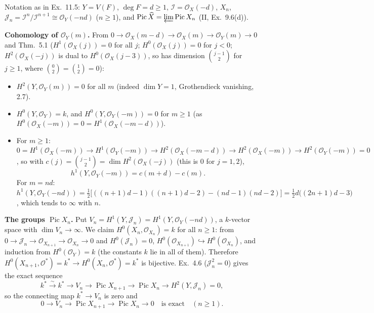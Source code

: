 \documentclass[11pt]{article}
\begin{document}
\pf
Notation as in Ex.~11.5: $Y=V(F)$, $\deg F=d\ge1$, $\mathcal I=\mathcal O_X(-d)$, $X_n$, $\mathcal J_n=\mathcal I^n/\mathcal I^{n+1}\cong\mathcal O_Y(-nd)$ ($n\geq 1$), and $\operatorname{Pic}\widehat X=\varprojlim\operatorname{Pic}X_n$ (II, Ex.~9.6(d)).

\medskip
\textbf{Cohomology of $\mathcal O_Y(m)$.} From $0\to\mathcal O_X(m-d)\to\mathcal O_X(m)\to\mathcal O_Y(m)\to0$ and Thm.~5.1 ($H^1(\mathcal O_X(j))=0$ for all $j$; $H^0(\mathcal O_X(j))=0$ for $j<0$; $H^2(\mathcal O_X(-j))$ is dual to $H^0(\mathcal O_X(j-3))$, so has dimension $\binom{j-1}{2}$ for $j\ge1$, where $\binom{0}{2}=\binom{1}{2}=0$):

\begin{itemize}
\item $H^2(Y,\mathcal O_Y(m))=0$ for all $m$ (indeed $\dim Y=1$, Grothendieck vanishing, 2.7).
\item $H^0(Y,\mathcal O_Y)=k$, and $H^0(Y,\mathcal O_Y(-m))=0$ for $m\ge1$ (as $H^0(\mathcal O_X(-m))=0=H^1(\mathcal O_X(-m-d))$).
\item For $m\ge1$: $0=H^1(\mathcal O_X(-m))\to H^1(\mathcal O_Y(-m))\to H^2(\mathcal O_X(-m-d))\to H^2(\mathcal O_X(-m))\to H^2(\mathcal O_Y(-m))=0$, so with $c(j)=\binom{j-1}{2}=\dim H^2(\mathcal O_X(-j))$ (this is $0$ for $j=1,2$),
\[
h^1(Y,\mathcal O_Y(-m))=c(m+d)-c(m).
\]
For $m=nd$: $h^1(Y,\mathcal O_Y(-nd))=\tfrac12\big[((n+1)d-1)((n+1)d-2)-(nd-1)(nd-2)\big]=\tfrac12 d\big((2n+1)d-3\big)$, which tends to $\infty$ with $n$.
\end{itemize}

\textbf{The groups $\operatorname{Pic}X_n$.} Put $V_n=H^1(Y,\mathcal J_n)=H^1(Y,\mathcal O_Y(-nd))$, a $k$-vector space with $\dim V_n\to\infty$. We claim $H^0(X_n,\mathcal O_{X_n})=k$ for all $n\ge1$: from $0\to\mathcal J_n\to\mathcal O_{X_{n+1}}\to\mathcal O_{X_n}\to0$ and $H^0(\mathcal J_n)=0$, $H^0(\mathcal O_{X_{n+1}})\hookrightarrow H^0(\mathcal O_{X_n})$, and induction from $H^0(\mathcal O_Y)=k$ (the constants $k$ lie in all of them). Therefore $H^0(X_{n+1},\mathcal O^*)=k^*\to H^0(X_n,\mathcal O^*)=k^*$ is bijective. Ex.~4.6 ($\mathcal J_n^2=0$) gives the exact sequence
\[
k^*\xrightarrow{\ \sim\ }k^*\to V_n\to\operatorname{Pic}X_{n+1}\to\operatorname{Pic}X_n\to H^2(Y,\mathcal J_n)=0,
\]
so the connecting map $k^*\to V_n$ is zero and
\[
0\to V_n\to\operatorname{Pic}X_{n+1}\to\operatorname{Pic}X_n\to0\quad\text{is exact}\quad(n\ge1).
\]
\end{document}
